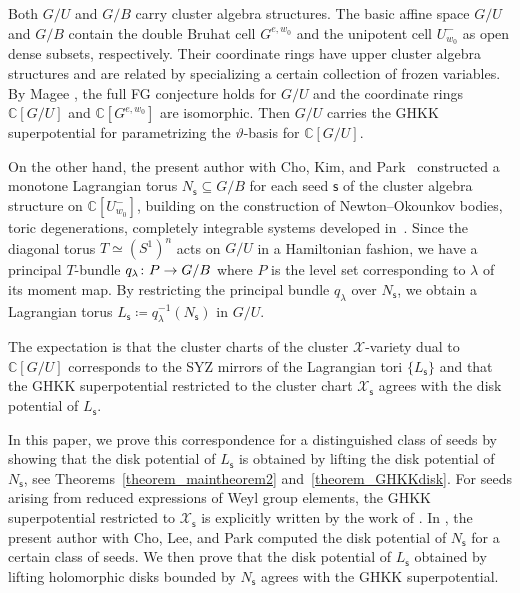 \documentclass[11pt]{amsart}
\theoremstyle{plain}
\theoremstyle{definition}
\theoremstyle{remark}
\newcommand{\C}{\mathbb{C}}
\numberwithin{equation}{section} \numberwithin{table}{section}
\def\to{\mathchoice{\longrightarrow}{\rightarrow}{\rightarrow}{\rightarrow}}
\numberwithin{equation}{section}
\begin{document}
Both $G/U$ and $G/B$ carry cluster algebra structures. The basic affine space $G/U$ and $G/B$ contain the double Bruhat cell $G^{e, w_0}$ and the unipotent cell $U^-_{w_0}$ as open dense subsets, respectively. Their coordinate rings have upper cluster algebra structures and are related by specializing a certain collection of frozen variables. By Magee \cite{Mag15}, the full FG conjecture holds for $G/U$ and the coordinate rings $\C[G/U]$ and $\C[G^{e, w_0}]$ are isomorphic. Then $G/U$ carries the GHKK superpotential for parametrizing the $\vartheta$-basis for $\C[G/U]$.

On the other hand, the present author with Cho, Kim, and Park~\cite{CKKP25} constructed a monotone Lagrangian torus $N_{\mathsf{s}} \subseteq G/B$ for each seed $\mathsf{s}$ of the cluster algebra structure on $\C[U^-_{w_0}]$, building on the construction of Newton--Okounkov bodies, toric degenerations, completely integrable systems developed in~\cite{And13, HK15, FO25}. Since the diagonal torus $T \simeq (S^1)^n$ acts on $G/U$ in a Hamiltonian fashion, we have a principal $T $-bundle $q_\lambda \colon P \to G/B$ where $P$ is the level set corresponding to $\lambda$ of its moment map. By restricting the principal bundle $q_\lambda$ over $N_\mathsf{s}$, we obtain a Lagrangian torus $L_\mathsf{s} \coloneqq q_\lambda^{-1}(N_{\mathsf{s}})$ in $G/U$. 

The expectation is that the cluster charts of the cluster $\mathcal{X}$-variety dual to $\C[G/U]$ corresponds to the SYZ mirrors of the Lagrangian tori $\{ L_\mathsf{s} \}$ and that the GHKK superpotential restricted to the cluster chart $\mathcal{X}_\mathsf{s}$ agrees with the disk potential of $L_\mathsf{s}$.

In this paper, we prove this correspondence for a distinguished class of seeds by showing that the disk potential of $L_\mathsf{s}$ is obtained by lifting the disk potential of $N_\mathsf{s}$, see Theorems~\ref{theorem_maintheorem2} and~\ref{theorem_GHKKdisk}. For seeds arising from reduced expressions of Weyl group elements, the GHKK superpotential restricted to $\mathcal{X}_\mathsf{s}$ is explicitly written by the work of \cite{Mag15, BF19}. In \cite{CKLP23}, the present author with Cho, Lee, and Park computed the disk potential of $N_\mathsf{s}$ for a certain class of seeds. We then prove that the disk potential of $L_\mathsf{s}$ obtained by lifting holomorphic disks bounded by $N_\mathsf{s}$ agrees with the GHKK superpotential.
\end{document}
